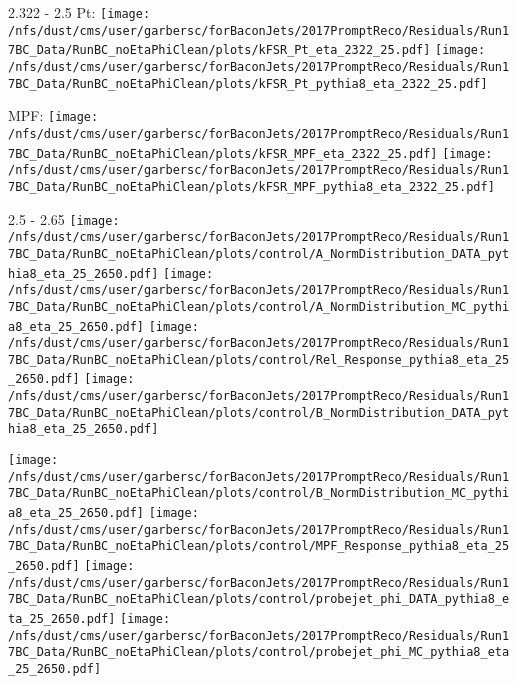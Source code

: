 \documentclass[t,compress]{beamer}
\begin{document}
\begin{frame}{2.322 - 2.5}
	 Pt: \texttt{[image: /nfs/dust/cms/user/garbersc/forBaconJets/2017PromptReco/Residuals/Run17BC\_Data/RunBC\_noEtaPhiClean/plots/kFSR\_Pt\_eta\_2322\_25.pdf]}
	\texttt{[image: /nfs/dust/cms/user/garbersc/forBaconJets/2017PromptReco/Residuals/Run17BC\_Data/RunBC\_noEtaPhiClean/plots/kFSR\_Pt\_pythia8\_eta\_2322\_25.pdf]}
\newline

	 MPF: \texttt{[image: /nfs/dust/cms/user/garbersc/forBaconJets/2017PromptReco/Residuals/Run17BC\_Data/RunBC\_noEtaPhiClean/plots/kFSR\_MPF\_eta\_2322\_25.pdf]}
	\texttt{[image: /nfs/dust/cms/user/garbersc/forBaconJets/2017PromptReco/Residuals/Run17BC\_Data/RunBC\_noEtaPhiClean/plots/kFSR\_MPF\_pythia8\_eta\_2322\_25.pdf]}
\end{frame}

\begin{frame}{2.5 - 2.65}
	\texttt{[image: /nfs/dust/cms/user/garbersc/forBaconJets/2017PromptReco/Residuals/Run17BC\_Data/RunBC\_noEtaPhiClean/plots/control/A\_NormDistribution\_DATA\_pythia8\_eta\_25\_2650.pdf]}
	\texttt{[image: /nfs/dust/cms/user/garbersc/forBaconJets/2017PromptReco/Residuals/Run17BC\_Data/RunBC\_noEtaPhiClean/plots/control/A\_NormDistribution\_MC\_pythia8\_eta\_25\_2650.pdf]}
	\texttt{[image: /nfs/dust/cms/user/garbersc/forBaconJets/2017PromptReco/Residuals/Run17BC\_Data/RunBC\_noEtaPhiClean/plots/control/Rel\_Response\_pythia8\_eta\_25\_2650.pdf]}
	\texttt{[image: /nfs/dust/cms/user/garbersc/forBaconJets/2017PromptReco/Residuals/Run17BC\_Data/RunBC\_noEtaPhiClean/plots/control/B\_NormDistribution\_DATA\_pythia8\_eta\_25\_2650.pdf]}
\newline

	\texttt{[image: /nfs/dust/cms/user/garbersc/forBaconJets/2017PromptReco/Residuals/Run17BC\_Data/RunBC\_noEtaPhiClean/plots/control/B\_NormDistribution\_MC\_pythia8\_eta\_25\_2650.pdf]}
	\texttt{[image: /nfs/dust/cms/user/garbersc/forBaconJets/2017PromptReco/Residuals/Run17BC\_Data/RunBC\_noEtaPhiClean/plots/control/MPF\_Response\_pythia8\_eta\_25\_2650.pdf]}
	\texttt{[image: /nfs/dust/cms/user/garbersc/forBaconJets/2017PromptReco/Residuals/Run17BC\_Data/RunBC\_noEtaPhiClean/plots/control/probejet\_phi\_DATA\_pythia8\_eta\_25\_2650.pdf]}
	\texttt{[image: /nfs/dust/cms/user/garbersc/forBaconJets/2017PromptReco/Residuals/Run17BC\_Data/RunBC\_noEtaPhiClean/plots/control/probejet\_phi\_MC\_pythia8\_eta\_25\_2650.pdf]}
\end{frame}
\end{document}
